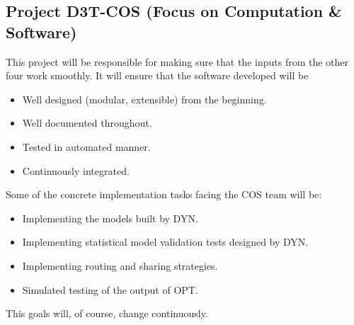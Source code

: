 \subsection*{Project D3T-COS (Focus on Computation & Software)}
This project will be responsible for making sure that the inputs from the other four 
work smoothly. It will ensure that the software developed will be
\begin{itemize}
\item Well designed (modular, extensible) from the beginning.
\item Well documented throughout.
\item Tested in automated manner. 
\item Continuously integrated.
\end{itemize}

Some of the concrete implementation tasks facing the COS team will be:
\begin{itemize}
\item Implementing the models built by DYN. 
\item Implementing statistical model validation tests designed by DYN.
\item Implementing routing \cite{guan_efficient_2013, zhang_probability_2013} and sharing \cite{santi_quantifying_2014} strategies. 
\item Simulated testing of the output of OPT. 
\end{itemize}
This goals will, of course, change continuously. 
